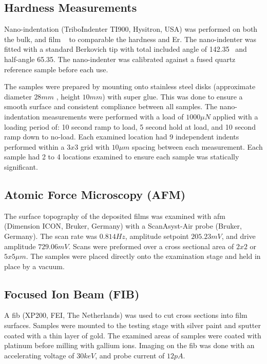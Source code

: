 \subsection{Hardness Measurements}
Nano-indentation (TriboIndenter TI900, Hysitron, USA) was performed on both the bulk, and film \MgZnCa~ to comparable the hardness and \gls{Er}. The nano-indenter was fitted with a standard Berkovich tip with total included angle of 142.35\degree~ and half-angle 65.35\degree. The nano-indenter was calibrated against a fused quartz reference sample before each use.   

The samples were prepared by mounting onto stainless steel disks (approximate diameter $28mm$ , height $10mm$) with super glue. This was done to ensure a smooth surface and consistent compliance between all samples. The nano-indentation measurements were performed with a load of $1000 \mu N$ applied with a loading period of: 10 second ramp to load, 5 second hold at load, and 10 second ramp down to no-load. Each examined location had 9 independent indents performed within a $3 x 3$ grid with $10 \mu m$ spacing between each measurement. Each sample had 2 to 4 locations examined to ensure each sample was statically significant. 

\subsection{Atomic Force Microscopy (AFM)}
The surface topography of the deposited films was examined with \gls{afm} (Dimension ICON, Bruker, Germany) with a ScanAsyst-Air probe (Bruker, Germany). The scan rate was $0.814 Hz$, amplitude setpoint $205.23 mV$, and drive amplitude $729.06 mV$. Scans were preformed over a cross sectional area of $2x2$ or $5x5 \mu m$. The samples were placed directly onto the examination stage and held in place by a vacuum. 

\subsection{Focused Ion Beam (FIB)}
A \gls{fib} (XP200, FEI, The Netherlands) was used to cut cross sections into film surfaces. Samples were mounted to the testing stage with silver paint and sputter coated with a thin layer of gold. The examined areas of samples were coated with platinum before milling with gallium ions. Imaging on the \gls{fib} was done with an accelerating voltage of $30keV$, and probe current of $12 pA$.


